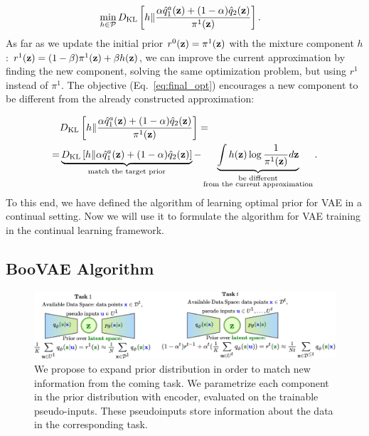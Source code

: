 \begin{equation}
\label{eq:final_opt}
\begin{aligned}
& \min\limits_{h\in\mathcal{P}}\KL{h}{\frac{\alpha\hat{q}_{1}^{a}(\rvz) + (1-\alpha)\hat{q}_{2}(\rvz)}{\pi^{1}(\rvz)}}.
\end{aligned}
\end{equation}
As far as we update the initial prior $r^{0}({\mathbf{z}})=\pi^{1}({\mathbf{z}})$ with the mixture component $h$: $r^1({\mathbf{z}})=(1-\beta)\pi^{1}({\mathbf{z}}) +\beta h({\mathbf{z}})$, we can improve the current approximation by finding the new component, solving the same optimization problem, but using $r^{1}$ instead of $\pi^{1}$. The objective (Eq.~\ref{eq:final_opt}) encourages a new component to be different from the already constructed approximation:

\begin{equation}
\label{eq:diff_encourage}
\begin{aligned}
 &\KL{h}{\frac{\alpha\hat{q}_{1}^{a}(\rvz) + (1-\alpha)\hat{q}_{2}(\rvz)}{\pi^{1}(\rvz)}} = \\
= &\underbrace{\KL{h}{\alpha\hat{q}_{1}^{a}(\rvz) + (1-\alpha)\hat{q}_{2}(\rvz)}}_{\text{match the target prior}} 
-  \underbrace{\int h(\rvz)\log\frac{1}{\pi^{1}(\rvz)} d\rvz}_{\substack{\text{be different} \\ \text{from the current approximation}}}.
\end{aligned}
\end{equation}
To this end, we have defined the algorithm of learning optimal prior for VAE in a continual setting. Now we will use it to formulate the algorithm for VAE training in the continual learning framework. 
\subsection{BooVAE Algorithm}
\begin{figure}[t]
	\centering
		\includegraphics[width=1.05\textwidth]{pics/1_boovae/kek.png}
	\caption{We propose to expand prior distribution in order to match new information from the coming task. We parametrize each component in the prior distribution with encoder, evaluated on the trainable pseudo-inputs. These pseudoinputs store information about the data in the corresponding task.}\label{fig:sheme_inc}
\end{figure}

